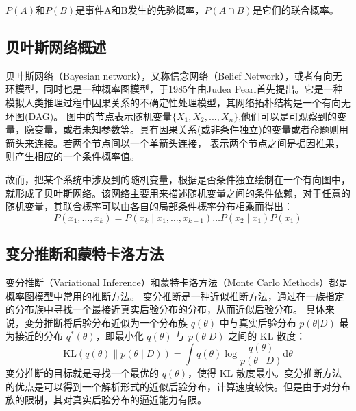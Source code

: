 $P(A)$和$P(B)$是事件A和B发生的先验概率，${P(A \cap B)}$是它们的联合概率。

\subsection{贝叶斯网络概述}
贝叶斯网络（Bayesian network），又称信念网络（Belief Network），或者有向无环模型，同时也是一种概率图模型，于1985年由Judea Pearl\cite{pearl1985bayesian}首先提出。它是一种模拟人类推理过程中因果关系的不确定性处理模型，其网络拓朴结构是一个有向无环图(DAG)。
图中的节点表示随机变量$\{X_1,X_2,...,X_n\}$,他们可以是可观察到的变量，隐变量，或者未知参数等。具有因果关系(或非条件独立)的变量或者命题则用箭头来连接。若两个节点间以一个单箭头连接，
表示两个节点之间是据因推果，则产生相应的一个条件概率值。

故而，把某个系统中涉及到的随机变量，根据是否条件独立绘制在一个有向图中，就形成了贝叶斯网络。该网络主要用来描述随机变量之间的条件依赖，对于任意的随机变量，其联合概率可以由各自的局部条件概率分布相乘而得出：
$$
P\left(x_1, \ldots, x_k\right)=P\left(x_k \mid x_1, \ldots, x_{k-1}\right) \ldots P\left(x_2 \mid x_1\right) P\left(x_1\right)
$$




\subsection{变分推断和蒙特卡洛方法}
变分推断（Variational Inference）和蒙特卡洛方法（Monte Carlo Methods）都是概率图模型中常用的推断方法。
变分推断是一种近似推断方法\cite{jordan1999introduction}，通过在一族指定的分布族中寻找一个最接近真实后验分布的分布，从而近似后验分布。
具体来说，变分推断将后验分布近似为一个分布族 $q(\theta)$ 中与真实后验分布 $p(\theta|D)$ 最为接近的分布 $q^*(\theta)$，即最小化 $q(\theta)$ 与 $p(\theta|D)$ 之间的 KL 散度：
$$
\mathrm{KL}(q(\theta) \| p(\theta \mid D))=\int q(\theta) \log \frac{q(\theta)}{p(\theta \mid D)} \mathrm{d} \theta
$$
变分推断的目标就是寻找一个最优的 $q(\theta)$，使得 KL 散度最小。变分推断方法的优点是可以得到一个解析形式的近似后验分布，计算速度较快。但是由于对分布族的限制，其对真实后验分布的逼近能力有限。

